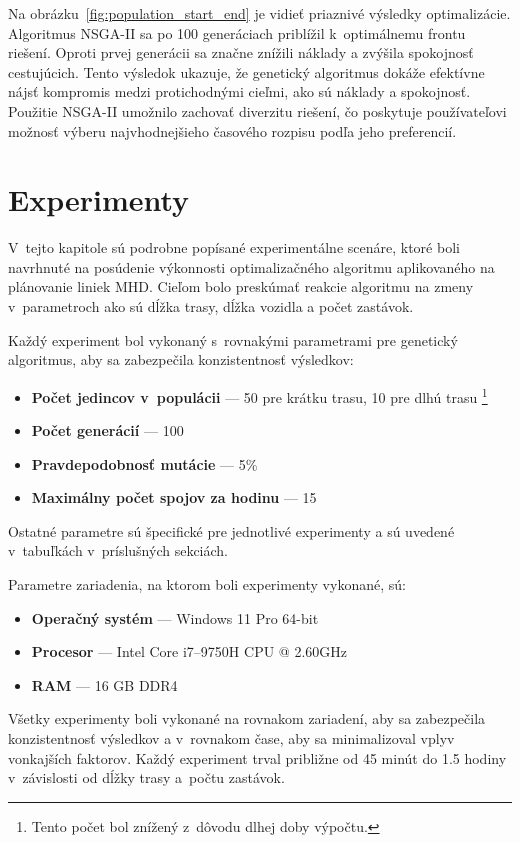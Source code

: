 Na obrázku~\ref{fig:population_start_end} je vidieť priaznivé výsledky optimalizácie.
Algoritmus NSGA-II sa po 100 generáciach priblížil k~optimálnemu frontu riešení.
Oproti prvej generácii sa značne znížili náklady a zvýšila spokojnosť cestujúcich.
Tento výsledok ukazuje, že genetický algoritmus dokáže efektívne nájsť kompromis medzi protichodnými cieľmi, ako sú náklady a spokojnosť.
Použitie NSGA-II umožnilo zachovať diverzitu riešení, čo poskytuje používateľovi možnosť výberu najvhodnejšieho časového rozpisu podľa jeho preferencií.

\chapter{Experimenty}\label{experimenty}

V~tejto kapitole sú podrobne popísané experimentálne scenáre, ktoré boli navrhnuté na posúdenie výkonnosti optimalizačného algoritmu aplikovaného na plánovanie liniek MHD.
Cieľom bolo preskúmať reakcie algoritmu na zmeny v~parametroch ako sú dĺžka trasy, dĺžka vozidla a počet zastávok.

Každý experiment bol vykonaný s~rovnakými parametrami pre genetický algoritmus, aby sa zabezpečila konzistentnosť výsledkov:
\begin{itemize}
  \item \textbf{Počet jedincov v~populácii} --- 50 pre krátku trasu, 10 pre dlhú trasu \footnote{Tento počet bol znížený z~dôvodu dlhej doby výpočtu.}
  \item \textbf{Počet generácií} --- 100
  \item \textbf{Pravdepodobnosť mutácie} --- 5\%
  \item \textbf{Maximálny počet spojov za hodinu} --- 15
\end{itemize}
Ostatné parametre sú špecifické pre jednotlivé experimenty a sú uvedené v~tabuľkách v~príslušných sekciách.

Parametre zariadenia, na ktorom boli experimenty vykonané, sú:
\begin{itemize}
  \item \textbf{Operačný systém} --- Windows 11 Pro 64-bit
  \item \textbf{Procesor} --- Intel Core i7--9750H CPU @ 2.60GHz
  \item \textbf{RAM} --- 16 GB DDR4
\end{itemize}

Všetky experimenty boli vykonané na rovnakom zariadení, aby sa zabezpečila konzistentnosť výsledkov
a v~rovnakom čase, aby sa minimalizoval vplyv vonkajších faktorov.
Každý experiment trval približne od 45 minút do 1.5 hodiny v~závislosti od dĺžky trasy a~počtu zastávok.

